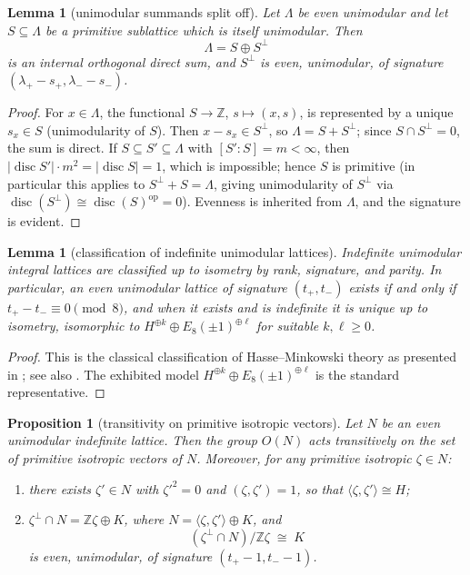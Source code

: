 \documentclass[11pt]{amsart}
\theoremstyle{plain}
\newtheorem{lemma}[theorem]{Lemma}
\newtheorem{proposition}[theorem]{Proposition}
\theoremstyle{definition}
\theoremstyle{remark}
\numberwithin{equation}{section}
\begin{document}
\begin{lemma}[unimodular summands split off]\label{L:splitting}
Let \(\Lambda\) be even unimodular and let \(S\subseteq\Lambda\) be a
primitive sublattice which is itself unimodular. Then
\[
\Lambda=S\oplus S^{\perp}
\]
is an internal orthogonal direct sum, and \(S^{\perp}\) is even, unimodular,
of signature \((\lambda_{+}-s_{+},\lambda_{-}-s_{-})\).
\end{lemma}

\begin{proof}
For \(x\in\Lambda\), the functional \(S\to\mathbb Z\),
\(s\mapsto(x,s)\), is represented by a unique \(s_{x}\in S\) (unimodularity
of \(S\)). Then \(x-s_{x}\in S^{\perp}\), so
\(\Lambda=S+S^{\perp}\); since \(S\cap S^{\perp}=0\), the sum is direct.
If \(S\subseteq S'\subseteq\Lambda\) with \([S':S]=m<\infty\), then
\(|\operatorname{disc}S'|\cdot m^{2}=|\operatorname{disc}S|=1\), which is
impossible; hence \(S\) is primitive (in particular this applies to
\(S^{\perp}+S=\Lambda\), giving unimodularity of \(S^{\perp}\) via
\(\operatorname{disc}(S^{\perp})\cong\operatorname{disc}(S)^{\mathrm{op}}=0\)).
Evenness is inherited from \(\Lambda\), and the signature is evident.
\end{proof}

\begin{lemma}[classification of indefinite unimodular lattices]
\label{L:classification}
Indefinite unimodular integral lattices are classified up to isometry by rank,
signature, and parity. In particular, an even unimodular lattice of signature
\((t_{+},t_{-})\) exists if and only if \(t_{+}-t_{-}\equiv 0\pmod 8\), and
when it exists and is indefinite it is unique up to isometry, isomorphic to
\(H^{\oplus k}\oplus E_{8}(\pm1)^{\oplus \ell}\) for suitable \(k,\ell\ge0\).
\end{lemma}

\begin{proof}
This is the classical classification of Hasse--Minkowski theory as
presented in \cite[Ch.\ V]{serre}; see also \cite[\S 1]{nikulin}. The
exhibited model \(H^{\oplus k}\oplus E_{8}(\pm1)^{\oplus\ell}\) is the
standard representative.
\end{proof}

\begin{proposition}[transitivity on primitive isotropic vectors]
\label{P:Eichler}
Let \(N\) be an even unimodular indefinite lattice. Then the group
\(O(N)\) acts transitively on the set of primitive isotropic vectors of
\(N\). Moreover, for any primitive isotropic \(\zeta\in N\):
\begin{enumerate}
\item there exists \(\zeta'\in N\) with \(\zeta'^{2}=0\) and
\((\zeta,\zeta')=1\), so that \(\langle\zeta,\zeta'\rangle\cong H\);
\item \(\zeta^{\perp}\cap N=\mathbb Z\zeta\oplus K\), where
\(N=\langle\zeta,\zeta'\rangle\oplus K\), and
\[
(\zeta^{\perp}\cap N)\big/\mathbb Z\zeta\;\cong\;K
\]
is even, unimodular, of signature
\((t_{+}-1,t_{-}-1)\).
\end{enumerate}
\end{proposition}
\end{document}
